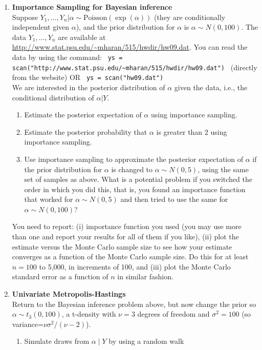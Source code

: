 \documentclass{article}
\begin{document}
\begin{enumerate}
\item {\bf Importance Sampling for Bayesian inference}\\ 
Suppose $Y_1,\dots,Y_n|\alpha \sim \mbox{Poisson}(\exp(\alpha))$
  (they are conditionally independent given $\alpha$), and the prior
  distribution for $\alpha$ is $\alpha \sim N(0,100)$.  The data
  $Y_1,\dots, Y_n$ are available at
  \url{http://www.stat.psu.edu/~mharan/515/hwdir/hw09.dat}. You can
  read the data by using the command: \verb+ ys = scan("http://www.stat.psu.edu/~mharan/515/hwdir/hw09.dat") + (directly from the website) OR \verb+ ys = scan("hw09.dat") + \\ We
  are interested in the posterior distribution of $\alpha$ given the
  data, i.e., the conditional distribution of $\alpha|Y$.
\begin{enumerate}
\item Estimate the posterior expectation of $\alpha$ using importance
  sampling. 
\item Estimate the posterior probability that $\alpha$ is greater than
  2  using importance sampling.
\item Use importance sampling to approximate the posterior expectation
  of $\alpha$ if the prior distribution for $\alpha$ is changed to
  $\alpha \sim N(0,5)$, using the same set of samples as above. What
  is a potential problem if you switched the order in which you did
  this, that is, you found an importance function that worked for
  $\alpha \sim N(0,5)$ and then tried to use the same for $\alpha \sim
  N(0,100)$?
\end{enumerate}
You need to report: (i) importance function you used (you may use more
than one and report your results for all of them if you like), (ii)
plot the estimate versus the Monte Carlo sample size to see how your
estimate converges as a function of the Monte Carlo sample size.  Do
this for at least $n=100$ to 5,000, in increments of 100, and (iii)
plot the Monte Carlo standard error as a function of $n$ in similar
fashion.
\item {\bf Univariate Metropolis-Hastings}\\
Return to the Bayesian inference problem above, but now change the
prior so $\alpha \sim t_3(0,100)$, a t-density with
  $\nu=3$ degrees of freedom and $\sigma^2=100$ (so
  variance=$\nu \sigma^2/(\nu-2)$).
\begin{enumerate}
\item Simulate draws from $\alpha\mid Y$ by using a random walk

\end{enumerate}
\end{enumerate}
\end{document}
